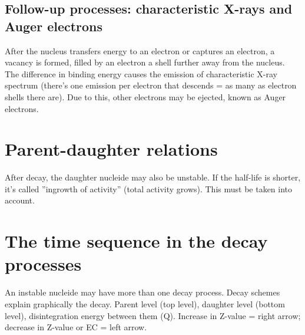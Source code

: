 \subsection{Follow-up processes: characteristic X-rays and Auger electrons} After the nucleus transfers energy to an electron or captures an electron, a vacancy is formed, filled by an electron a shell further away from the nucleus. The difference in binding energy causes the emission of characteristic X-ray spectrum (there's one emission per electron that descends = as many as electron shells there are). Due to this, other electrons may be ejected, known as Auger electrons.
\section{Parent-daughter relations}
After decay, the daughter nucleide may also be unstable. If the half-life is shorter, it's called ''ingrowth of activity'' (total activity grows). This must be taken into account.
\section{The time sequence in the decay processes}
An instable nucleide may have more than one decay process. Decay schemes explain graphically the decay. Parent level (top level), daughter level (bottom level), disintegration energy between them (Q). Increase in Z-value = right arrow; decrease in Z-value or EC = left arrow. 

